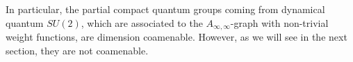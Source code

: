  In particular, the partial compact quantum groups coming from
 dynamical quantum $SU(2)$, which are associated to the $A_{\infty,\infty}$-graph with non-trivial weight functions, are dimension coamenable. However, as we
 will see in the next section, they are not coamenable.


